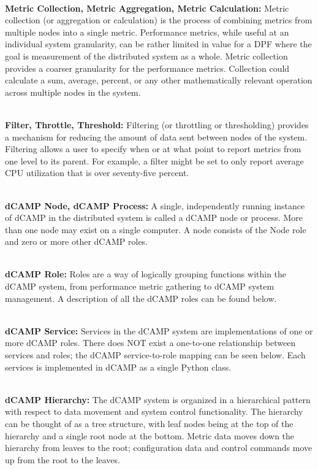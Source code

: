 ~\\ \textbf{Metric Collection, Metric Aggregation, Metric Calculation:} Metric collection (or aggregation or calculation) is the process of combining metrics from multiple nodes into a single metric. Performance metrics, while useful at an individual system granularity, can be rather limited in value for a DPF where the goal is measurement of the distributed system as a whole. Metric collection provides a coarser granularity for the performance metrics. Collection could calculate a sum, average, percent, or any other mathematically relevant operation across multiple nodes in the system. 

~\\ \textbf{Filter, Throttle, Threshold:} Filtering (or throttling or thresholding) provides a mechanism for reducing the amount of data sent between nodes of the system. Filtering allows a user to specify when or at what point to report metrics from one level to its parent. For example, a filter might be set to only report average CPU utilization that is over seventy-five percent. 

~\\ \textbf{dCAMP Node, dCAMP Process:} A single, independently running instance of dCAMP in the distributed system is called a dCAMP node or process. More than one node may exist on a single computer. A node consists of the Node role and zero or more other dCAMP roles. 

~\\ \textbf{dCAMP Role:} Roles are a way of logically grouping functions within the dCAMP system, from performance metric gathering to dCAMP system management. A description of all the dCAMP roles can be found below. 

~\\ \textbf{dCAMP Service:} Services in the dCAMP system are implementations of one or more dCAMP roles. There does NOT exist a one-to-one relationship between services and roles; the dCAMP service-to-role mapping can be seen below. Each services is implemented in dCAMP as a single Python class. 

~\\ \textbf{dCAMP Hierarchy:} The dCAMP system is organized in a hierarchical pattern with respect to data movement and system control functionality. The hierarchy can be thought of as a tree structure, with leaf nodes being at the top of the hierarchy and a single root node at the bottom. Metric data moves down the hierarchy from leaves to the root; configuration data and control commands move up from the root to the leaves. 

